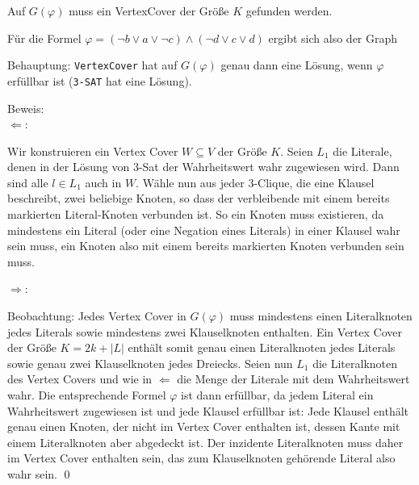 \documentclass[a4paper]{article}
\begin{document}
Auf $G(\varphi)$ muss ein VertexCover der Größe $K$ gefunden werden.

Für die Formel $\varphi = (\neg b \vee a \vee \neg c) \wedge (\neg d \vee c \vee d)$ ergibt sich also der Graph


Behauptung: \texttt{VertexCover} hat auf $G(\varphi)$ genau dann eine Lösung, wenn $\varphi$ erfüllbar ist (\texttt{3-SAT} hat eine Lösung).

Beweis: \\
$\Leftarrow$:

Wir konstruieren ein Vertex Cover $W \subseteq V$ der Größe $K$.
Seien $L_1$ die Literale, denen in der Lösung von 3-Sat der Wahrheitswert wahr zugewiesen wird.
Dann sind alle $l \in L_1$ auch in $W$.
Wähle nun aus jeder 3-Clique, die eine Klausel beschreibt, zwei beliebige Knoten, so dass der verbleibende mit einem bereits markierten Literal-Knoten verbunden ist.
So ein Knoten muss existieren, da mindestens ein Literal (oder eine Negation eines Literals) in einer Klausel wahr sein muss, ein Knoten also mit einem bereits markierten Knoten verbunden sein muss.

$\Rightarrow$:

Beobachtung: Jedes Vertex Cover in $G(\varphi)$ muss mindestens einen Literalknoten jedes Literals sowie mindestens zwei Klauselknoten enthalten.
Ein Vertex Cover der Größe $K = 2k + |L|$ enthält somit genau einen Literalknoten jedes Literals sowie genau zwei Klauselknoten jedes Dreiecks.
Seien nun $L_1$ die Literalknoten des Vertex Covers und wie in $\Leftarrow$ die Menge der Literale mit dem Wahrheitswert wahr.
Die entsprechende Formel $\varphi$ ist dann erfüllbar, da jedem Literal ein Wahrheitswert zugewiesen ist und jede Klausel erfüllbar ist:
Jede Klausel enthält genau einen Knoten, der nicht im Vertex Cover enthalten ist, dessen Kante mit einem Literalknoten aber abgedeckt ist.
Der inzidente Literalknoten muss daher im Vertex Cover enthalten sein, das zum Klauselknoten gehörende Literal also wahr sein.
\hfill{} \qed{}
\end{document}
